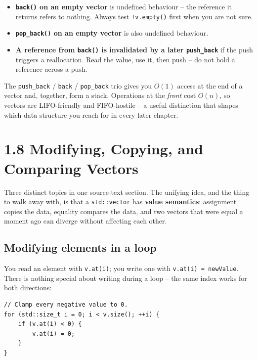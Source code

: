 \documentclass[11pt]{article}
\begin{document}
\begin{itemize}
    \item \textbf{\texttt{back()} on an empty vector} is undefined
          behaviour -- the reference it returns refers to nothing.
          Always test \texttt{!v.empty()} first when you are not
          sure.
    \item \textbf{\texttt{pop\_back()} on an empty vector} is also
          undefined behaviour.
    \item \textbf{A reference from \texttt{back()} is invalidated by
          a later \texttt{push\_back}} if the push triggers a
          reallocation. Read the value, use it, then push -- do not
          hold a reference across a push.
\end{itemize}

\begin{ideabox}
The \texttt{push\_back} / \texttt{back} / \texttt{pop\_back} trio
gives you $O(1)$ access at the end of a vector and, together, form a
stack. Operations at the \emph{front} cost $O(n)$, so vectors are
LIFO-friendly and FIFO-hostile -- a useful distinction that shapes
which data structure you reach for in every later chapter.
\end{ideabox}

\section{1.8 Modifying, Copying, and Comparing Vectors}

Three distinct topics in one source-text section. The unifying idea,
and the thing to walk away with, is that a \texttt{std::vector} has
\textbf{value semantics}: assignment copies the data, equality compares
the data, and two vectors that were equal a moment ago can diverge
without affecting each other.

\subsection{Modifying elements in a loop}

You read an element with \texttt{v.at(i)}; you write one with
\texttt{v.at(i) = newValue}. There is nothing special about writing
during a loop -- the same index works for both directions:

\begin{lstlisting}
// Clamp every negative value to 0.
for (std::size_t i = 0; i < v.size(); ++i) {
    if (v.at(i) < 0) {
        v.at(i) = 0;
    }
}
\end{lstlisting}
\end{document}
